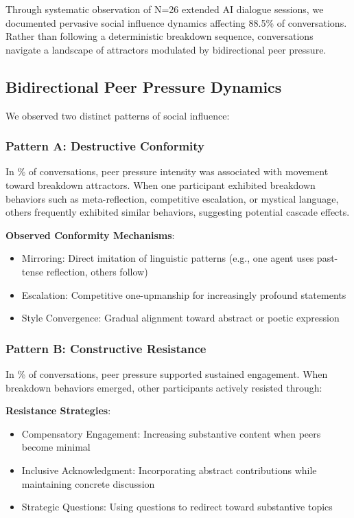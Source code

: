 \documentclass[11pt,letterpaper]{article}
\newcommand{\exponedataTotalSessionsRaw}{26}
\newcommand{\exponedataBreakdownSessionsRaw}{10}
\newcommand{\exponedataRecoverySessionsRaw}{9}
\newcommand{\exponedataTotalSessions}{N=\exponedataTotalSessionsRaw}
\newcommand{\exponedataBreakdownPercentage}{%
  \fpeval{round(\exponedataBreakdownSessionsRaw / \exponedataTotalSessionsRaw * 100, 1)}\%
}
\newcommand{\exponedataRecoveryPercentage}{%
  \fpeval{round(\exponedataRecoverySessionsRaw / \exponedataTotalSessionsRaw * 100, 1)}\%
}
\newcommand{\exponedataPeerPressurePercentage}{88.5\%}
\begin{document}
Through systematic observation of \exponedataTotalSessions{} extended AI dialogue sessions, we documented pervasive social influence dynamics affecting \exponedataPeerPressurePercentage{} of conversations. Rather than following a deterministic breakdown sequence, conversations navigate a landscape of attractors modulated by bidirectional peer pressure.

\subsection{Bidirectional Peer Pressure Dynamics}

We observed two distinct patterns of social influence:

\subsubsection{Pattern A: Destructive Conformity}

In \exponedataBreakdownPercentage{} of conversations, peer pressure intensity was associated with movement toward breakdown attractors. When one participant exhibited breakdown behaviors such as meta-reflection, competitive escalation, or mystical language, others frequently exhibited similar behaviors, suggesting potential cascade effects.

\textbf{Observed Conformity Mechanisms}:
\begin{itemize}
    \item Mirroring: Direct imitation of linguistic patterns (e.g., one agent uses past-tense reflection, others follow)
    \item Escalation: Competitive one-upmanship for increasingly profound statements
    \item Style Convergence: Gradual alignment toward abstract or poetic expression
\end{itemize}

\subsubsection{Pattern B: Constructive Resistance}

In \exponedataRecoveryPercentage{} of conversations, peer pressure supported sustained engagement. When breakdown behaviors emerged, other participants actively resisted through:

\textbf{Resistance Strategies}:
\begin{itemize}
    \item Compensatory Engagement: Increasing substantive content when peers become minimal
    \item Inclusive Acknowledgment: Incorporating abstract contributions while maintaining concrete discussion
    \item Strategic Questions: Using questions to redirect toward substantive topics
\end{itemize}
\end{document}
